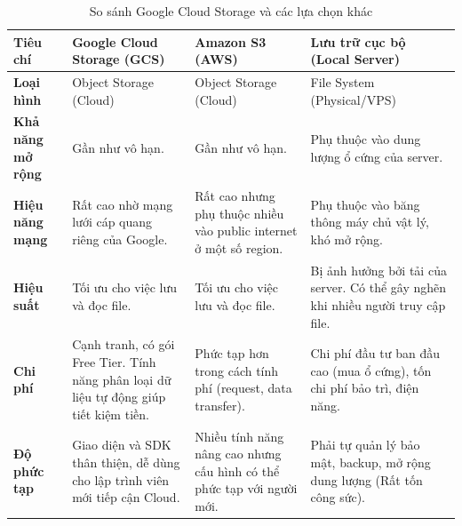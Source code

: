 \begin{landscape}
    \begin{table}[h!]
        \centering
        \setlength{\tabcolsep}{4pt}
        \footnotesize
        \begin{tabularx}{\linewidth}{|l|X|X|X|}
            \hline
            \textbf{Tiêu chí}         & \textbf{Google Cloud Storage (GCS)}                                                                                & \textbf{Amazon S3 (AWS)}                                               & \textbf{Lưu trữ cục bộ (Local Server)}                                           \\
            \hline
            \textbf{Loại hình}        & Object Storage (Cloud)                                                                                             & Object Storage (Cloud)                                                 & File System (Physical/VPS)                                                       \\
            \hline
            \textbf{Khả năng mở rộng} & Gần như vô hạn.                                                                                                    & Gần như vô hạn.                                                        & Phụ thuộc vào dung lượng ổ cứng của server.                                      \\
            \hline
            \textbf{Hiệu năng mạng}   & Rất cao nhờ mạng lưới cáp quang riêng của Google.                                                                  & Rất cao nhưng phụ thuộc nhiều vào public internet ở một số region.     & Phụ thuộc vào băng thông máy chủ vật lý, khó mở rộng.                            \\
            \hline
            \textbf{Hiệu suất}        & Tối ưu cho việc lưu và đọc file.                                                                                   & Tối ưu cho việc lưu và đọc file.                                       & Bị ảnh hưởng bởi tải của server. Có thể gây nghẽn khi nhiều người truy cập file. \\
            \hline
            \textbf{Chi phí}          & Cạnh tranh, có gói Free Tier. Tính năng phân loại dữ liệu tự động giúp tiết kiệm tiền. & Phức tạp hơn trong cách tính phí (request, data transfer).             & Chi phí đầu tư ban đầu cao (mua ổ cứng), tốn chi phí bảo trì, điện năng.         \\
            \hline
            \textbf{Độ phức tạp}      & Giao diện và SDK thân thiện, dễ dùng cho lập trình viên mới tiếp cận Cloud.                                        & Nhiều tính năng nâng cao nhưng cấu hình có thể phức tạp với người mới. & Phải tự quản lý bảo mật, backup, mở rộng dung lượng (Rất tốn công sức).          \\
            \hline
        \end{tabularx}
        \caption{So sánh Google Cloud Storage và các lựa chọn khác}
    \end{table}
\end{landscape}
